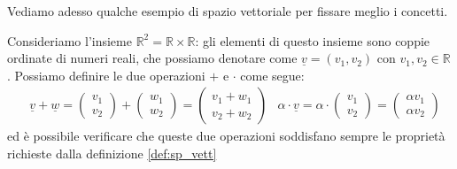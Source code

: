 Vediamo adesso qualche esempio di spazio vettoriale per fissare meglio i concetti.
\begin{example}
    Consideriamo l'insieme $\mathbb{R}^2 = \mathbb{R} \times \mathbb{R}$: gli elementi di questo insieme sono coppie ordinate di numeri reali, che possiamo denotare come $\underline{v} = (v_1, v_2)$ con $v_1, v_2 \in \mathbb{R}$. Possiamo definire le due operazioni $+$ e $\cdot$ come segue:
    \begin{align}
        &\underline{v} + \underline{w} = \begin{pmatrix} v_1 \\ v_2 \end{pmatrix} + \begin{pmatrix} w_1 \\ w_2 \end{pmatrix} = \begin{pmatrix} v_1 + w_1 \\ v_2 + w_2 \end{pmatrix}
        &\alpha \cdot \underline{v} = \alpha \cdot \begin{pmatrix} v_1 \\ v_2 \end{pmatrix} = \begin{pmatrix} \alpha v_1 \\ \alpha v_2 \end{pmatrix}
    \end{align}
    ed è possibile verificare che queste due operazioni soddisfano sempre le proprietà richieste dalla definizione \ref{def:sp_vett}
\end{example}
